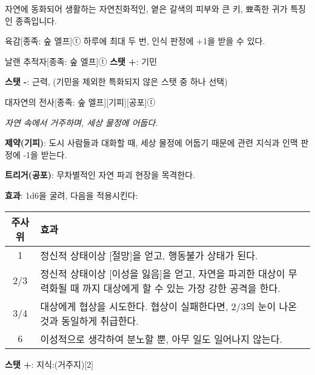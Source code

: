 \documentclass{report}
\begin{document}
	자연에 동화되어 생활하는 자연친화적인, 옅은 갈색의 피부와 큰 키, 뾰족한 귀가 특징인 종족입니다.
	
	\begin{story}{육감}{[종족: 숲 엘프]ⓣ}
		하루에 최대 두 번, 인식 판정에 +1을 받을 수 있다.
		
	\end{story}
	
	\begin{story}{날랜 추적자}{[종족: 숲 엘프]ⓣ}
		\textbf{스탯 +}: 기민
		
		\textbf{스탯 -}: 근력, (기민을 제외한 특화되지 않은 스탯 중 하나 선택)
		
	\end{story}
	
	\begin{story}{대자연의 전사}{[종족: 숲 엘프][기피][공포]ⓣ}
		
		\textit{자연 속에서 거주하며, 세상 물정에 어둡다.}
		
		\textbf{제약(기피)}: 도시 사람들과 대화할 때, 세상 물정에 어둡기 때문에 관련 지식과 인맥 판정에 -1을 받는다.
		
		\smallskip
		
		\textbf{트리거(공포)}: 무차별적인 자연 파괴 현장을 목격한다.
		
		\textbf{효과}: 1d6을 굴려, 다음을 적용시킨다:
		
		\begin{center}
			\begin{tabularx}{\textwidth}{c|X}
				\textbf{주사위} & \textbf{효과}                                        \\\hline\hline
				1               & 정신적 상태이상 [절망]을 얻고, 행동불가 상태가 된다. \\\hline
				2/3            & 정신적 상태이상 [이성을 잃음]을 얻고, 자연을 파괴한 대상이 무력화될 때 까지 대상에게 할 수 있는 가장 강한 공격을 한다. \\\hline
				3/4            & 대상에게 협상을 시도한다. 협상이 실패한다면, 2/3의 눈이 나온것과 동일하게 취급한다. \\\hline
				6               & 이성적으로 생각하여 분노할 뿐, 아무 일도 일어나지 않는다. \\
			\end{tabularx}
		\end{center}
		
		\textbf{스탯 +}: 지식:(거주지)[2]
		
	\end{story}
	
\end{document}
